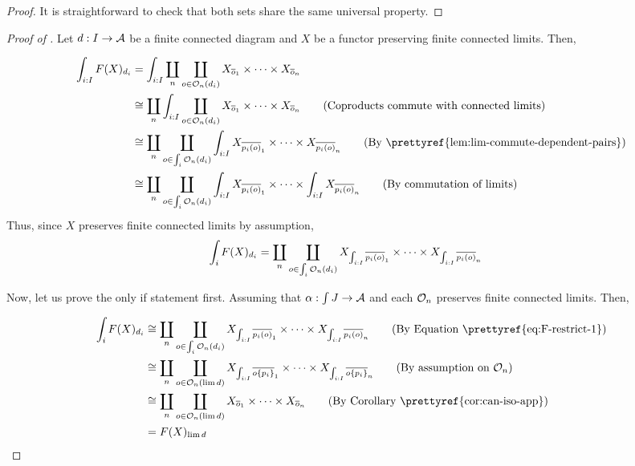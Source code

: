 \begin{proof}
It is straightforward to check that both sets share the same universal
property.
\end{proof}
%
\begin{proof}
[Proof of ]Let $d:I\rightarrow{\cal A}$
be a finite connected diagram and $X$ be a functor preserving finite
connected limits. Then,

\begin{align*}
\int_{i:I}F(X)_{d_{i}} & =\int_{i:I}\coprod_{n}\coprod_{o\in\Oop n{d_{i}}}X_{\nthar o1}\times\dots\times X_{\nthar on}\\
 & \cong\coprod_{n}\int_{i:I}\coprod_{o\in\Oop n{d_{i}}}X_{\nthar o1}\times\dots\times X_{\nthar on}\tag{Coproducts commute with connected limits}\\
 & \cong\coprod_{n}\coprod_{o\in\int_{i}\Oop n{d_{i}}}\int_{i:I}X_{\nthar{p_{i}(o)}1}\times\dots\times X_{\nthar{p_{i}(o)}n}\tag{By \prettyref{lem:lim-commute-dependent-pairs}}\\
 & \cong\coprod_{n}\coprod_{o\in\int_{i}\Oop n{d_{i}}}\int_{i:I}X_{\nthar{p_{i}(o)}1}\times\dots\times\int_{i:I}X_{\nthar{p_{i}(o)}n}\tag{By commutation of limits}
\end{align*}
Thus, since $X$ preserves finite connected limits by assumption,
\begin{align}
\int_{i}F(X)_{d_{i}} & =\coprod_{n}\coprod_{o\in\int_{i}\Oop n{d_{i}}}X_{\int_{i:I}\nthar{p_{i}(o)}1}\times\dots\times X_{\int_{i:I}\nthar{p_{i}(o)}n}\label{eq:F-restrict-1}
\end{align}

Now, let us prove the only if statement first. Assuming that $\alpha:\int J\rightarrow{\cal A}$
and each $\Oby n$ preserves finite connected limits. Then,

\begin{align*}
\int_{i}F(X)_{d_{i}} & \cong\coprod_{n}\coprod_{o\in\int_{i}\Oop n{d_{i}}}X_{\int_{i:I}\nthar{p_{i}(o)}1}\times\dots\times X_{\int_{i:I}\nthar{p_{i}(o)}n}\tag{By Equation \prettyref{eq:F-restrict-1}}\\
 & \cong\coprod_{n}\coprod_{o\in\Oop n{\lim d}}X_{\int_{i:I}\nthar{\rename o{p_{i}}}1}\times\dots\times X_{\int_{i:I}\nthar{\rename o{p_{i}}}n}\tag{By assumption on \ensuremath{\Oby n}}\\
 & \cong\coprod_{n}\coprod_{o\in\Oop n{\lim d}}X_{\nthar o1}\times\dots\times X_{\nthar on}\tag{By Corollary \prettyref{cor:can-iso-app}}\\
 & =F(X)_{\lim d}
\end{align*}


\end{proof}
